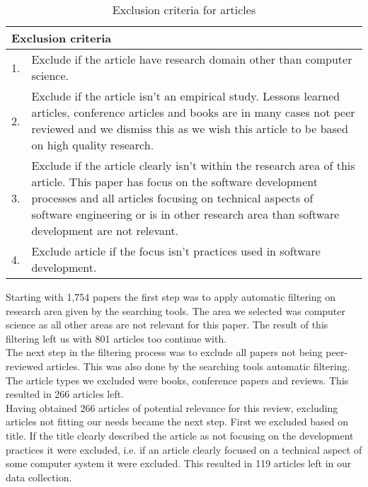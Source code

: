 \documentclass{article}
\begin{document}
\begin{table}[h!]
	\begin{center}
		\begin{tabular}{l p{}}
		 	\multicolumn{2}{l}{Exclusion criteria}\\
		 	\hline
			1. & Exclude if the article have research domain other than computer science. \\
			2. & Exclude if the article isn't an empirical study. Lessons learned articles, conference articles and books are in many cases not peer reviewed and we dismiss this as we wish this article to be based on high quality research. \\
			3. & Exclude if the article clearly isn't within the research area of this article. This paper has focus on the software development processes and all articles focusing on technical aspects of software engineering or is in other research area than software development are not relevant. \\
			4. & Exclude article if the focus isn't practices used in software development. \\
		\end{tabular}
		\caption{Exclusion criteria for articles}
		\label{table:datacriteria}
	\end{center}
\end{table}

Starting with 1,754 papers the first step was to apply automatic filtering on research area given by the searching tools. The area we selected was computer science as all other areas are not relevant for this paper. The result of this filtering left us with 801 articles too continue with. \\

The next step in the filtering process was to exclude all papers not being peer-reviewed articles. This was also done by the searching tools automatic filtering. The article types we excluded were books, conference papers and reviews. This resulted in 266 articles left. \\

Having obtained 266 articles of potential relevance for this review, excluding articles not fitting our needs became the next step. First we excluded based on title. If the title clearly described the article as not focusing on the development practices it were excluded, i.e. if an article clearly focused on a technical aspect of some computer system it were excluded. This resulted in 119 articles left in our data collection. \\
\end{document}
